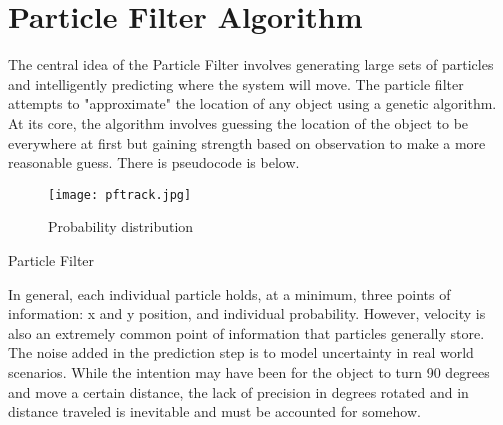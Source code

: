 \documentclass{llncs}
\makeatletter
\def\BState{\State\hskip-\ALG@thistlm}
\makeatother
\begin{document}
\section{Particle Filter Algorithm}
%
The central idea of the Particle Filter involves generating large sets of particles and intelligently predicting where the system will move. 
\newline
\newline
\indent The particle filter attempts to "approximate" the location of any object using a genetic algorithm. At its core, the algorithm involves guessing the location of the object to be everywhere at first but gaining strength based on observation to make a more reasonable guess. There is pseudocode is below.
\begin{wrapfigure}{}{}
  \begin{center}
    \texttt{[image: pftrack.jpg]}
  \end{center}
  \caption{Probability distribution}
\end{wrapfigure}
\pagebreak
\begin{algorithm}
\caption{Particle Filter}\label{euclid}
\end{algorithm}
\newline
\newline
\indent In general, each individual particle holds, at a minimum, three points of information: x and y position, and individual probability. However, velocity is also an extremely common point
of information that particles generally store. The noise added in the prediction step is to model uncertainty in real world scenarios. While the intention may have been for the object to turn 90 degrees and move a certain distance, the lack of precision in degrees rotated and in distance traveled is inevitable and must be accounted for somehow. 
\newline 
\end{document}

